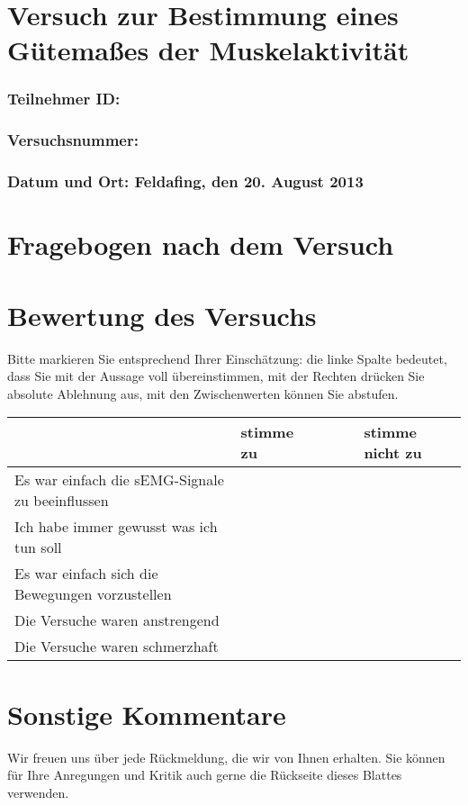 \documentclass{article}
\begin{document}
\section*{Versuch zur Bestimmung eines Gütema\ss es der Muskelaktivität}

\subsubsection*{Teilnehmer ID:}
\subsubsection*{Versuchsnummer:}
\subsubsection*{Datum und Ort: Feldafing, den 20. August 2013}
\vspace{1cm}

\section*{Fragebogen nach dem Versuch}

\section{Bewertung des Versuchs}
Bitte markieren Sie entsprechend Ihrer Einschätzung: die linke Spalte bedeutet, dass Sie mit der Aussage voll \"ubereinstimmen, mit der Rechten dr\"ucken Sie absolute Ablehnung aus, mit den Zwischenwerten k\"onnen Sie abstufen.
\begin{center}
  \begin{tabular}{ |p{} |  p{} | p{} | p{} | p{} | p{} |  }
    \hline
     & stimme zu & & & & stimme nicht zu \\ \hline
    Es war einfach die sEMG-Signale zu beeinflussen  & & & & &\\ \hline
	Ich habe immer gewusst was ich tun soll  & & & & &\\ \hline
    Es war einfach sich die Bewegungen vorzustellen  & & & & &\\ \hline
    Die Versuche waren anstrengend & & & & &\\ \hline
    Die Versuche waren schmerzhaft & & & & &\\ \hline
  \end{tabular}
\end{center}

\section{Sonstige Kommentare}
Wir freuen uns \"uber jede R\"uckmeldung, die wir von Ihnen erhalten.
Sie k\"onnen f\"ur Ihre Anregungen und Kritik auch gerne die R\"uckseite dieses Blattes verwenden.
\end{document}
